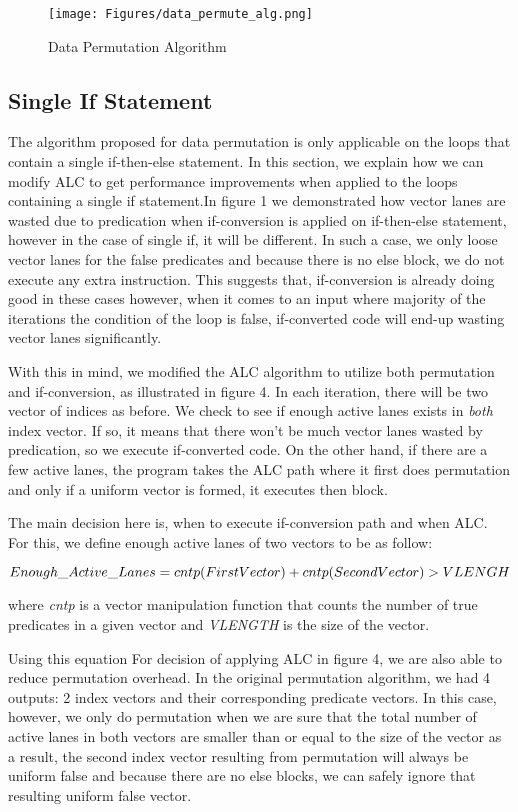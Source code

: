 \begin{figure*}[h]
  \centering
  \texttt{[image: Figures/data\_permute\_alg.png]}
  \caption{Data Permutation Algorithm}
\end{figure*}

\subsection{Single If Statement}
The algorithm proposed for data permutation is only applicable on the loops that contain a single if-then-else statement. In this section, we explain how we can modify ALC to get performance improvements when applied to the loops containing a single if statement.In figure 1 we demonstrated how vector lanes are wasted due to predication when if-conversion is applied on if-then-else statement, however in the case of single if, it will be different. In such a case, we only loose vector lanes for the false predicates and because there is no else block, we do not execute any extra instruction. This suggests that, if-conversion is already doing good in these cases however, when it comes to an input where majority of the iterations the condition of the loop is false, if-converted code will end-up wasting vector lanes significantly.

With this in mind, we modified the ALC algorithm to utilize both permutation and if-conversion, as illustrated in figure 4. In each iteration, there will be two vector of indices as before. We check to see if enough active lanes exists in \emph{both} index vector. If so, it means that there won't be much vector lanes wasted by predication, so we execute if-converted code. On the other hand, if  there are a few active lanes, the program takes the ALC path where it first does permutation and only if a uniform vector is formed, it executes then block.

The main decision here is, when to execute if-conversion path and when ALC. For this, we define enough active lanes of two vectors to be as follow:

 \begin{math} Enough\_Active\_Lanes = \\
    cntp(FirstVector) + cntp(SecondVector) > VLENGH 
 \end{math}

 where \emph{cntp} is a vector manipulation function that counts the number of true predicates in a given vector and \emph{VLENGTH} is the size of the vector. 
 
 Using this equation For decision of applying ALC in figure 4, we are also able to reduce permutation overhead. In the original permutation algorithm, we had 4 outputs: 2 index vectors and their corresponding predicate vectors. In this case, however, we only do permutation when we are sure that the total number of active lanes in both vectors are smaller than or equal to the size of the vector as a result, the second index vector resulting from permutation will always be uniform false and because there are no else blocks, we can safely ignore that resulting uniform false vector. 

